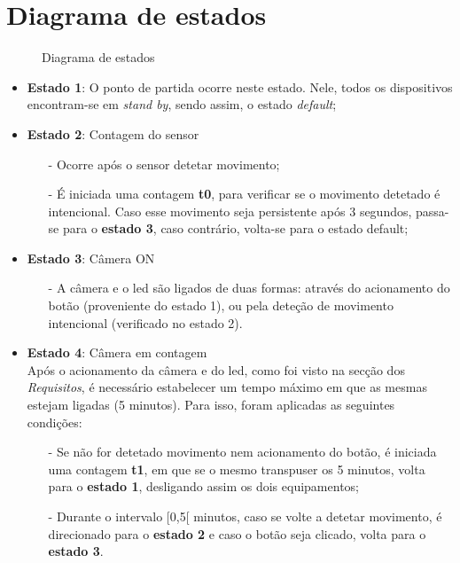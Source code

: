 \documentclass{article}
\begin{document}
\newpage
\section{Diagrama de estados}

    \begin{figure}[h!]
    \centering
    \caption{Diagrama de estados}
    \label{fig:diagEstados}
\end{figure}

\begin{itemize}
     \item \textbf{Estado 1}: O ponto de partida ocorre neste estado. Nele, todos os dispositivos encontram-se em \textit{stand by}, sendo assim, o estado \textit{default};
    
    \item \textbf{Estado 2}: Contagem do sensor
        \begin{itemize}
            \item[-] Ocorre após o sensor detetar movimento;
            \item[-] É iniciada uma contagem \textbf{t0}, para verificar se o movimento detetado é intencional. Caso esse movimento seja persistente após 3 segundos, passa-se para o \textbf{estado 3}, caso contrário, volta-se para o estado default;
        \end{itemize}
        
    \item \textbf{Estado 3}: Câmera ON
        \begin{itemize}
            \item[-] A câmera e o led são ligados de duas formas: através do acionamento do botão (proveniente do estado 1), ou pela deteção de movimento intencional (verificado no estado 2).
        \end{itemize}
        
    \item \textbf{Estado 4}: Câmera em contagem \\
    
        \hspace{0.5cm}Após o acionamento da câmera e do led, como foi visto na secção dos \textit{Requisitos},  é necessário estabelecer um tempo máximo em que as mesmas estejam ligadas (5 minutos). Para isso, foram aplicadas as seguintes condições:
        
        \begin{itemize}
            \item[-] Se não for detetado movimento nem acionamento do botão, é iniciada uma contagem \textbf{t1}, em que se o mesmo transpuser os 5 minutos, volta para o \textbf{estado 1}, desligando assim os dois equipamentos;
            \item[-] Durante o intervalo [0,5[ minutos, caso se volte a detetar movimento, é direcionado para o \textbf{estado 2} e caso o botão seja clicado, volta para o \textbf{estado 3}.
        \end{itemize}
    
    
\end{itemize}
\end{document}

